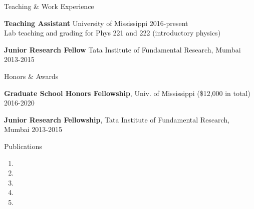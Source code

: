 \documentclass{resume} %
\begin{document}
\begin{rSection}{Teaching \& Work Experience}

{\bf Teaching Assistant } University of Mississippi \hfill 2016-present  \\
\hspace*{1cm} Lab teaching and grading for Phys 221 and 222 (introductory physics) 


{\bf Junior Research Fellow} Tata Institute of Fundamental Research, Mumbai \hfill 2013-2015 


\end{rSection}



\begin{rSection}{Honors \& Awards}

{\bf Graduate School Honors Fellowship}, Univ. of Mississippi (\$12,000 in total)               \hfill 2016-2020 


{\bf Junior Research Fellowship}, Tata Institute of Fundamental Research, Mumbai \hfill 2013-2015 


\end{rSection}
  



\begin{rSection}{Publications}
  \begin{enumerate}
  	\item {}
  	\item {}
    \item {}
    \item {}
    \item {}
  \end{enumerate}
  \end{rSection}
 

\newpage
 
\end{document}
